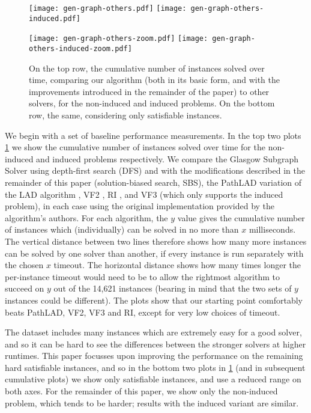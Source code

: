 \documentclass[runningheads]{llncs}
\begin{document}
\begin{figure}[tb]
    \texttt{[image: gen-graph-others.pdf]}
    \hfill
    \texttt{[image: gen-graph-others-induced.pdf]}

    \bigskip

    \texttt{[image: gen-graph-others-zoom.pdf]}
    \hfill
    \texttt{[image: gen-graph-others-induced-zoom.pdf]}

    \caption{On the top row, the cumulative number of instances solved over time, comparing our algorithm
    (both in its basic form, and with the improvements introduced in the remainder of the paper) to
    other solvers, for the non-induced and induced problems. On the bottom row, the same,
    considering only satisfiable instances.}
    \label{figure:others}
\end{figure}

We begin with a set of baseline performance measurements. In the top
two plots \cref{figure:others} we show the cumulative number of instances solved over time for the
non-induced and induced problems respectively. We compare the Glasgow Subgraph Solver using
depth-first search (DFS) and with the modifications described in the remainder of this paper
(solution-biased search, SBS), the PathLAD variation of the LAD algorithm
\cite{DBLP:journals/ai/Solnon10,DBLP:conf/lion/KotthoffMS16}, VF2
\cite{DBLP:journals/pami/CordellaFSV04}, RI \cite{DBLP:journals/bmcbi/BonniciGPSF13}, and VF3
\cite{DBLP:conf/gbrpr/CarlettiFSV17} (which only supports the induced problem), in each case using
the original implementation provided by the algorithm's authors. For each algorithm, the $y$ value
gives the cumulative number of instances which (individually) can be solved in no more than $x$
milliseconds.  The vertical distance between two lines therefore shows how many more instances can
be solved by one solver than another, if every instance is run separately with the chosen $x$
timeout. The horizontal distance shows how many times longer the per-instance timeout would need to
be to allow the rightmost algorithm to succeed on $y$ out of the 14,621 instances (bearing in mind
that the two sets of $y$ instances could be different).  The plots show that our starting point
comfortably beats PathLAD, VF2, VF3 and RI, except for very low choices of timeout.

The dataset includes many instances which are extremely easy for a good solver, and so it can be
hard to see the differences between the stronger solvers at higher runtimes. This paper focusses
upon improving the performance on the remaining hard satisfiable instances, and so in the bottom two
plots in \cref{figure:others} (and in subsequent cumulative plots) we show only satisfiable
instances, and use a reduced range on both axes.  For the remainder of this paper, we show only the
non-induced problem, which tends to be harder; results with the induced variant are similar.
\end{document}
